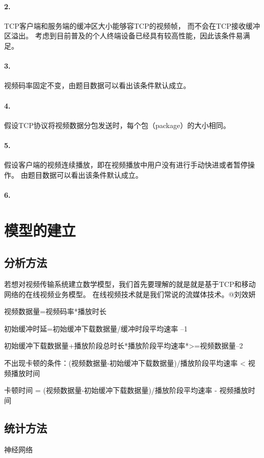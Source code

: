 \documentclass[UTF8]{ctexart}
\begin{document}
\paragraph{2.}
TCP客户端和服务端的缓冲区大小能够容TCP的视频帧， 而不会在TCP接收缓冲区溢出。
考虑到目前普及的个人终端设备已经具有较高性能，因此该条件易满足。
\paragraph{3.}
视频码率固定不变，由题目数据可以看出该条件默认成立。
\paragraph{4.}
假设TCP协议将视频数据分包发送时，每个包（package）的大小相同。
\paragraph{5.}
假设客户端的视频连续播放，即在视频播放中用户没有进行手动快进或者暂停操作。
由题目数据可以看出该条件默认成立。
\paragraph{6.}




\section{模型的建立}

\subsection{分析方法}
若想对视频传输系统建立数学模型，我们首先要理解的就是就是基于TCP和移动网络的在线视频业务模型。
在线视频技术就是我们常说的流媒体技术。@刘效妍


视频数据量=视频码率*播放时长

初始缓冲时延=初始缓冲下载数据量/缓冲时段平均速率 --1

初始缓冲下载数据量+播放阶段总时长*播放阶段平均速率*>=视频数据量--2

不出现卡顿的条件：(视频数据量-初始缓冲下载数据量)/播放阶段平均速率 < 视频播放时间

卡顿时间 = (视频数据量-初始缓冲下载数据量)/播放阶段平均速率 - 视频播放时间

\subsection{统计方法}
神经网络
\end{document}
